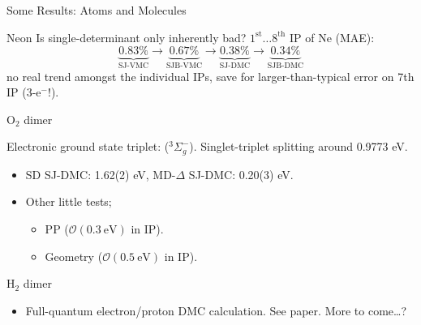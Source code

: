 \documentclass[10pt, pdf, hyperref={draft}, usenames, dvipsnames]{beamer}
\begin{document}
\begin{frame}{Some Results: Atoms and Molecules}

\begin{block}{Neon}
  Is single-determinant only inherently bad? $1^{\text{st}}\ldots8^{\text{th}}$
  IP of Ne (MAE):
  \begin{equation}
    \underbrace{0.83\%}_{\text{SJ-VMC}} \rightarrow
    \underbrace{0.67\%}_{\text{SJB-VMC}} \rightarrow
    \underbrace{0.38\%}_{\text{SJ-DMC}} \rightarrow
    \underbrace{0.34\%}_{\text{SJB-DMC}}
  \end{equation}
  no real trend amongst the individual IPs, save for larger-than-typical error
  on 7th IP (3-e$^{-}$!).
\end{block}

\begin{block}{O$_2$ dimer}

Electronic ground state triplet: ($^{3}\Sigma^{-}_g$).  Singlet-triplet
splitting around 0.9773 eV.

\begin{itemize}
  \item SD SJ-DMC: 1.62(2) eV, MD-$\Delta$ SJ-DMC: 0.20(3) eV.
  \item Other little tests;
  \begin{itemize}
    \item PP ($\mathcal{O}(0.3\ \text{eV})$ in IP).
    \item Geometry ($\mathcal{O}(0.5\ \text{eV})$ in IP).
  \end{itemize}
\end{itemize}

\end{block}

\begin{block}{H$_2$ dimer}

  \begin{itemize}
    \item Full-quantum electron/proton DMC calculation. See paper. More to
    come\ldots?
  \end{itemize}
\end{block}

\end{frame}
\end{document}
